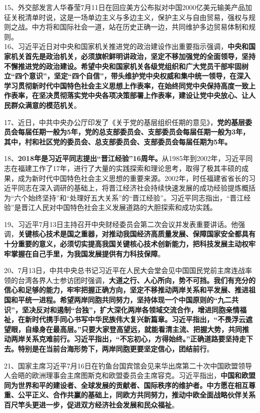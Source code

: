 15、外交部发言人华春莹7月11日在回应美方公布拟对中国2000亿美元输美产品加征关税清单时说，这是一场单边主义与多边主义，保护主义与自由贸易，强权与规则之战。中方将和国际社会一道，站在历史正确一边，共同维护多边贸易体制和规则。\\

16、习近平近日对中央和国家机关推进党的政治建设作出重要指示强调，{\textbf{中央和国家机关首先是政治机关，必须旗帜鲜明讲政治，坚定不移加强党的全面领导，坚持不懈推进党的政治建设。希望中央和国家机关各级党组织和广大党员干部牢固树立``四个意识''，坚定``四个自信''，带头维护党中央权威和集中统一领导，在深入学习贯彻新时代中国特色社会主义思想上作表率，在始终同党中央保持高度一致上作表率，在坚决贯彻落实党中央各项决策部署上作表率，建设让党中央放心、让人民群众满意的模范机关}}。

17、近日，中共中央办公厅印发了《关于党的基层组织任期的意见》，{\textbf{党的基层委员会每届任期一般为5年，党的总支部委员会、支部委员会每届任期一般为3年，其中，村和社区党的委员会、总支部委员会、支部委员会每届任期为5年。}}

18、{\textbf{2018年是习近平同志提出``晋江经验''16周年。}}从1985年到2002年，习近平同志在福建工作了17年，进行了大量的实践探索和理论思考，取得了极其丰硕的成果，成为新时代中国特色社会主义思想的重要来源。2002年，时任福建省省长的习近平同志在深入调研的基础上，将晋江经济社会持续快速发展的成功经验提炼概括为``六个始终坚持''和``处理好五大关系''的``晋江经验''。习近平同志指出，``晋江经验''是晋江人民对中国特色社会主义发展道路的大胆探索和成功实践。

19、习近平7月13日主持召开中央财经委员会第二次会议并发表重要讲话。他强调，{\textbf{关键核心技术是国之重器，对推动我国经济高质量发展、保障国家安全都具有十分重要的意义，必须切实提高我国关键核心技术创新能力，把科技发展主动权牢牢掌握在自己手里，为我国发展提供有力科技保障}}。

20、7月13日，中共中央总书记习近平在人民大会堂会见中国国民党前主席连战率领的台湾各界人士参访团时强调，{\textbf{大道之行、人心所向，势不可挡。我们有充分的信心和足够的能力，牢牢把握正确方向，坚定不移推动两岸关系和平发展、推进祖国和平统一进程。希望两岸同胞共同努力，坚持体现一个中国原则的``九二共识''，坚决反对和遏制``台独''，扩大深化两岸各领域交流合作，增进同胞亲情福祉，在新时代携手同心书写中华民族伟大复兴新篇章。习近平指出，``不畏浮云遮望眼，自缘身在最高层。''只要大家登高望远，就能看清主流、把握大势，共同推动两岸关系克难前行。习近平指出，``不忘初心，方得始终。''正确道路要坚持走下去。特别是在当前台海形势下，两岸同胞更要坚定信心，团结前行}}。

21、国家主席习近平7月16日在钓鱼台国宾馆会见来华出席第二十次中国欧盟领导人会晤的欧洲理事会主席图斯克和欧盟委员会主席容克。习近平指出，{\textbf{中国和欧盟同为世界和平的建设者、全球发展的贡献者、国际秩序的维护者。中方愿在相互尊重、公平正义、合作共赢的基础上，同欧方共同努力，推动中欧全面战略伙伴关系百尺竿头更进一步，促进双方经济社会发展和民众福祉}}。

